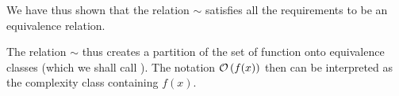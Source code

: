 We have thus shown that the relation $\sim$ satisfies all the requirements to
be an equivalence relation. 

%
The relation $\sim$ thus creates a partition of the set of function onto
equivalence classes (which we shall call ). The
notation
${\mathcal O}\/\left(f(x)\right)$ then can be interpreted as the complexity class containing $f(x)$.



